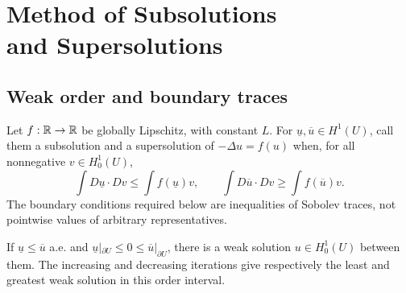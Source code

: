 \section[Method of Subsolutions and Supersolutions]{Method of Subsolutions\texorpdfstring{\\}{ }and Supersolutions}
\label{sec:9-3}
\Needspace{40mm}
\subsection{Weak order and boundary traces}
Let $f:\mathbb{R}\to\mathbb{R}$ be globally Lipschitz, with constant $L$. For
$\underline u,\overline u\in H^1(U)$, call them a subsolution and a
supersolution of $-\Delta u=f(u)$ when, for all nonnegative $v\in H^1_0(U)$,
\[
 \int D\underline u\cdot Dv\leq\int f(\underline u)v,\qquad
 \int D\overline u\cdot Dv\geq\int f(\overline u)v.
\]
The boundary conditions required below are inequalities of Sobolev traces,
not pointwise values of arbitrary representatives.
\Needspace{50mm}
\begin{theorem}
If $\underline u\leq\overline u$ a.e. and
$\underline u|_{\partial U}\leq0\leq\overline u|_{\partial U}$,
there is a weak solution $u\in H^1_0(U)$ between them.
The increasing and decreasing iterations give respectively the least and
greatest weak solution in this order interval.
\end{theorem}
